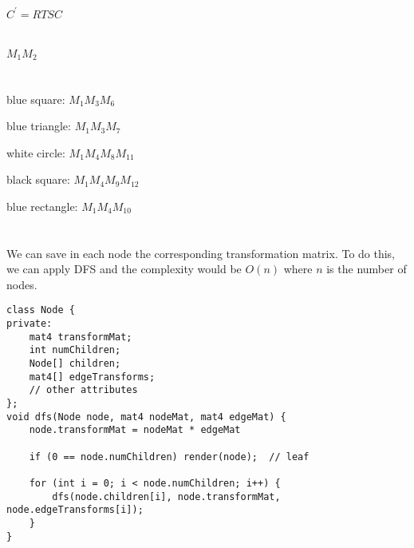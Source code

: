 \documentclass[12pt,letterpaper,onecolumn]{article}
\begin{document}
\section{}
$C^\prime = RTSC$

\section{}
$M_1 M_2$

\section{}
\begin{multicols}{2} 
blue square: $M_1 M_3 M_6$

blue triangle: $M_1 M_3 M_7$

white circle: $M_1 M_4 M_8 M_{11}$

black square: $M_1 M_4 M_9 M_{12}$

blue rectangle: $M_1 M_4 M_{10}$
\end{multicols}

\section{}

We can save in each node the corresponding transformation
matrix.
To do this, we can apply DFS and the complexity would be 
$O(n)$ where $n$ is the number of nodes.

\begin{lstlisting}
class Node {
private:
    mat4 transformMat;
    int numChildren;
    Node[] children;
    mat4[] edgeTransforms;
    // other attributes
};
void dfs(Node node, mat4 nodeMat, mat4 edgeMat) {
    node.transformMat = nodeMat * edgeMat

    if (0 == node.numChildren) render(node);  // leaf
        
    for (int i = 0; i < node.numChildren; i++) {
        dfs(node.children[i], node.transformMat, node.edgeTransforms[i]);
    }
}
    

\end{lstlisting}
\end{document}
